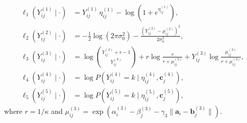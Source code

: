 \documentclass[A4paper,11pt]{article}
\begin{document}
\begin{align}
  \ell_1(Y^{(1)}_{ij}\mid\cdot) &= Y^{(1)}_{ij}\,\eta^{(1)}_{ij} - \log(1+e^{\eta^{(1)}_{ij}}), \label{eq:ll1}\\[6pt]
  \ell_2(Y^{(2)}_{ij}\mid\cdot) &= -\frac{1}{2}\log(2\pi\sigma^2_0) - \frac{(Y^{(2)}_{ij}-\mu^{(2)}_{ij})^2}{2\sigma^2_0}, \label{eq:ll2}\\[6pt]
  \ell_3(Y^{(3)}_{ij}\mid\cdot) &= \log\binom{Y^{(3)}_{ij}+r-1}{Y^{(3)}_{ij}} + r\log\frac{r}{r+\mu^{(3)}_{ij}} + Y^{(3)}_{ij}\log\frac{\mu^{(3)}_{ij}}{r+\mu^{(3)}_{ij}}, \label{eq:ll3}\\[6pt]
  \ell_4(Y^{(4)}_{ij}\mid\cdot) &= \log P(Y^{(4)}_{ij} = k \mid \eta^{(4)}_{ij}, \bm{c}^{(4)}_j), \label{eq:ll4}\\[6pt]
  \ell_5(Y^{(5)}_{ij}\mid\cdot) &= \log P(Y^{(5)}_{ij} = k \mid \eta^{(5)}_{ij}, \bm{c}^{(5)}_j), \label{eq:ll5}
\end{align}
where $r = 1/\kappa$ and $\mu^{(3)}_{ij} = \exp(\alpha^{(3)}_i - \beta^{(3)}_j - \gamma_3\|\bm{a}_i - \bm{b}^{(3)}_j\|)$.
\end{document}

